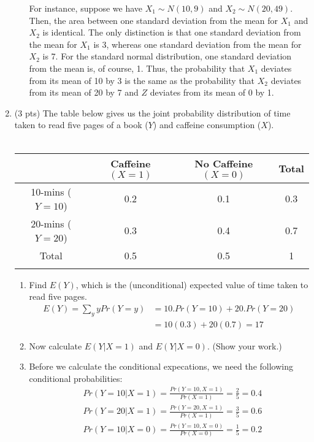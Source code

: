 \documentclass{./../../Latex/handout}
\begin{document}
\begin{enumerate}
\begin{enumerate}
For instance, suppose we have $X_1 \sim N(10,9)$ and $X_2 \sim N(20,49)$. Then, the area between one standard deviation from the mean for $X_1$ and $X_2$ is identical. The only distinction is that one standard deviation from the mean for $X_1$ is 3, whereas one standard deviation from the mean for $X_2$ is 7. For the standard normal distribution, one standard deviation from the mean is, of course, 1. Thus, the probability that $X_1$ deviates from its mean of 10 by 3 is the same as the probability that $X_2$ deviates from its mean of 20 by 7 and $Z$ deviates from its mean of 0 by 1. \\
\end{enumerate} 

\item (3 pts) The table below gives us the joint probability distribution of time taken to read five pages of a book ($Y$)  and caffeine consumption ($X$). \\~\\
\begin{tabularx}{0.95\textwidth}{cccc}
\toprule
	& Caffeine $(X=1)$ & No Caffeine $(X=0)$ & Total \\
	\midrule
10-mins ($Y=10$) & 0.2  & 0.1 & 0.3 \\ 
20-mins ($Y=20$) & 0.3 & 0.4 & 0.7 \\
\midrule
 Total & 0.5 & 0.5 & 1 \\
 \bottomrule \\
\end{tabularx}
\begin{enumerate}
\item Find $E(Y)$, which is the (unconditional) expected value of time taken to read five pages.
\begin{align*}
  E(Y) = \sum_y y Pr(Y=y) &= 10. Pr(Y=10) + 20. Pr(Y=20) \\
  &= 10(0.3) + 20(0.7) = 17
\end{align*}
\item Now calculate $E(Y|X=1)$ and $E(Y|X=0)$. (Show your work.)
\item[] Before we calculate the conditional expecations, we need the following conditional probabilities:
\begin{align*}
  & Pr(Y=10| X= 1) = \frac{Pr(Y=10, X= 1)}{Pr(X=1)} = \frac{2}{5} = 0.4 \\ 
  & Pr(Y=20| X= 1) = \frac{Pr(Y=20, X= 1)}{Pr(X=1)} = \frac{3}{5} = 0.6 \\
  & Pr(Y=10| X= 0) = \frac{Pr(Y=10, X= 0)}{Pr(X=0)} = \frac{1}{5} =0.2 \\

\end{align*}
\end{enumerate}
\end{enumerate}
\end{document}
